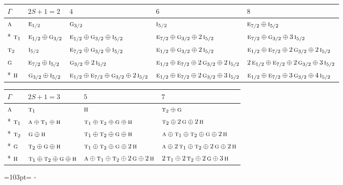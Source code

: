 \documentclass[10pt,a4paper]{article}
\newcommand{\needspace}[1]{\par\penalty-100\begingroup\dimen0=#1\relax\dimen2=\pagegoal
  \advance\dimen2-\pagetotal\ifdim\dimen0>\dimen2\relax\ifdim\dimen2>0pt\vfil\break\fi\fi
  \endgroup}
\numberwithin{equation}{section}
\newcommand{\irr}[1]{\text{\normalfont\scshape #1}}
\begin{document}
{\small\setlength{\tabcolsep}{3pt}\begin{longtable}{@{}l>{\RaggedRight\arraybackslash}p{}>{\RaggedRight\arraybackslash}p{}>{\RaggedRight\arraybackslash}p{}>{\RaggedRight\arraybackslash}p{}@{}}\toprule
$\Gamma$ & $2S + 1 = 2$ & $4$ & $6$ & $8$\\\midrule\endhead
\bottomrule\endfoot\endlastfoot
$\irr{a}$ & $\irr{e}_{1/2}$ & $\irr{g}_{3/2}$ & $\irr{i}_{5/2}$ & $\irr{e}_{7/2}\oplus \irr{i}_{5/2}$\\*
$\irr{t}_{1}$ & $\irr{e}_{1/2}\oplus \irr{g}_{3/2}$ & $\irr{e}_{1/2}\oplus \irr{g}_{3/2}\oplus \irr{i}_{5/2}$ & $\irr{e}_{7/2}\oplus \irr{g}_{3/2}\oplus 2\,\irr{i}_{5/2}$ & $\irr{e}_{7/2}\oplus \irr{g}_{3/2}\oplus 3\,\irr{i}_{5/2}$\\
$\irr{t}_{2}$ & $\irr{i}_{5/2}$ & $\irr{e}_{7/2}\oplus \irr{g}_{3/2}\oplus \irr{i}_{5/2}$ & $\irr{e}_{1/2}\oplus \irr{g}_{3/2}\oplus 2\,\irr{i}_{5/2}$ & $\irr{e}_{1/2}\oplus \irr{e}_{7/2}\oplus 2\,\irr{g}_{3/2}\oplus 2\,\irr{i}_{5/2}$\\
$\irr{g}$ & $\irr{e}_{7/2}\oplus \irr{i}_{5/2}$ & $\irr{g}_{3/2}\oplus 2\,\irr{i}_{5/2}$ & $\irr{e}_{1/2}\oplus \irr{e}_{7/2}\oplus 2\,\irr{g}_{3/2}\oplus 2\,\irr{i}_{5/2}$ & $2\,\irr{e}_{1/2}\oplus \irr{e}_{7/2}\oplus 2\,\irr{g}_{3/2}\oplus 3\,\irr{i}_{5/2}$\\*
$\irr{h}$ & $\irr{g}_{3/2}\oplus \irr{i}_{5/2}$ & $\irr{e}_{1/2}\oplus \irr{e}_{7/2}\oplus \irr{g}_{3/2}\oplus 2\,\irr{i}_{5/2}$ & $\irr{e}_{1/2}\oplus \irr{e}_{7/2}\oplus 2\,\irr{g}_{3/2}\oplus 3\,\irr{i}_{5/2}$ & $\irr{e}_{1/2}\oplus \irr{e}_{7/2}\oplus 3\,\irr{g}_{3/2}\oplus 4\,\irr{i}_{5/2}$\\
\bottomrule\end{longtable}}
{\small\setlength{\tabcolsep}{3pt}\begin{longtable}{@{}llll@{}}\toprule
$\Gamma$ & $2S + 1 = 3$ & $5$ & $7$\\\midrule\endhead
\bottomrule\endfoot\endlastfoot
$\irr{a}$ & $\irr{t}_{1}$ & $\irr{h}$ & $\irr{t}_{2}\oplus \irr{g}$\\*
$\irr{t}_{1}$ & $\irr{a}\oplus \irr{t}_{1}\oplus \irr{h}$ & $\irr{t}_{1}\oplus \irr{t}_{2}\oplus \irr{g}\oplus \irr{h}$ & $\irr{t}_{2}\oplus 2\,\irr{g}\oplus 2\,\irr{h}$\\*
$\irr{t}_{2}$ & $\irr{g}\oplus \irr{h}$ & $\irr{t}_{1}\oplus \irr{t}_{2}\oplus \irr{g}\oplus \irr{h}$ & $\irr{a}\oplus \irr{t}_{1}\oplus \irr{t}_{2}\oplus \irr{g}\oplus 2\,\irr{h}$\\*
$\irr{g}$ & $\irr{t}_{2}\oplus \irr{g}\oplus \irr{h}$ & $\irr{t}_{1}\oplus \irr{t}_{2}\oplus \irr{g}\oplus 2\,\irr{h}$ & $\irr{a}\oplus 2\,\irr{t}_{1}\oplus \irr{t}_{2}\oplus 2\,\irr{g}\oplus 2\,\irr{h}$\\*
$\irr{h}$ & $\irr{t}_{1}\oplus \irr{t}_{2}\oplus \irr{g}\oplus \irr{h}$ & $\irr{a}\oplus \irr{t}_{1}\oplus \irr{t}_{2}\oplus 2\,\irr{g}\oplus 2\,\irr{h}$ & $2\,\irr{t}_{1}\oplus 2\,\irr{t}_{2}\oplus 2\,\irr{g}\oplus 3\,\irr{h}$\\
\bottomrule\end{longtable}}
\needspace{103pt}
\end{document}
